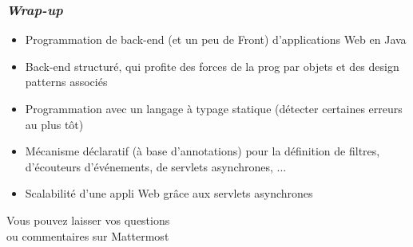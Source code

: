 \documentclass{beamer}
\begin{document}
\begin{frame}
	\frametitle{\textit{Wrap-up}}
	\begin{itemize}
		\item Programmation de back-end (et un peu de Front) d'applications Web en Java 
		\item Back-end structuré, qui profite des forces de la prog par objets et des design patterns associés
		\item Programmation avec un langage à typage statique (détecter certaines erreurs au plus tôt)
		\item Mécanisme déclaratif (à base d'annotations) pour la définition de filtres, d'écouteurs d'événements, de servlets asynchrones, ...
		\item Scalabilité d'une appli Web grâce aux servlets asynchrones
	\end{itemize}
\end{frame}

\begin{frame}
  \begin{center}
  
  	\vspace{5cm}
  	
  	Vous pouvez laisser vos questions\\ ou commentaires sur Mattermost
  \end{center}
\end{frame}
\end{document}
